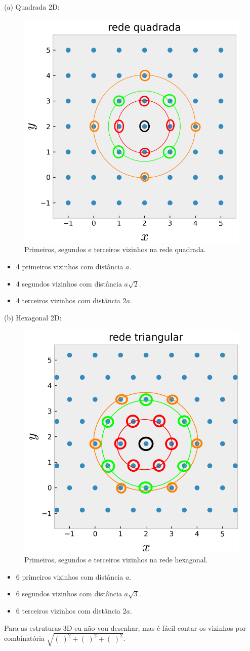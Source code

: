 \documentclass[a4paper,10pt]{article}
\begin{document}
\section{}

(a) Quadrada 2D:
\begin{figure}[H]
\centering
\includegraphics[width=0.3\linewidth]{fig/nn_quad}
\caption{Primeiros, segundos e terceiros vizinhos na rede quadrada.}
\label{fig:nn_quad}
\end{figure}
\begin{itemize}
\item 4 primeiros vizinhos com distância $a$.
\item 4 segundos vizinhos com distância $a\sqrt{2}$.
\item 4 terceiros vizinhos com distância $2a$.
\end{itemize}

(b) Hexagonal 2D:
\begin{figure}[H]
\centering
\includegraphics[width=0.3\linewidth]{fig/nn_triang}
\caption{Primeiros, segundos e terceiros vizinhos na rede hexagonal.}
\label{fig:nn_triang}
\end{figure}
\begin{itemize}
\item 6 primeiros vizinhos com distância $a$.
\item 6 segundos vizinhos com distância $a\sqrt{3}$.
\item 6 terceiros vizinhos com distância $2a$.
\end{itemize}

Para as estruturas 3D eu não vou desenhar, mas é fácil contar os vizinhos por combinatória $\sqrt{(\;)^2+(\;)^2+(\;)^2}$.
\end{document}
